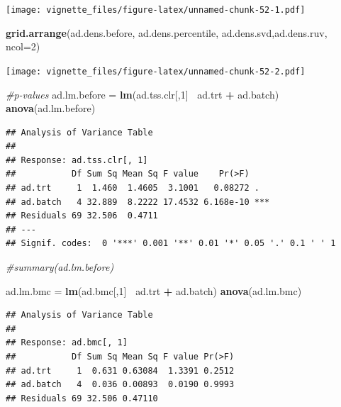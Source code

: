 \documentclass[]{book}
\newenvironment{Shaded}{\begin{snugshade}}{\end{snugshade}}
\newcommand{\KeywordTok}[1]{\textcolor[rgb]{0.13,0.29,0.53}{\textbf{#1}}}
\newcommand{\DataTypeTok}[1]{\textcolor[rgb]{0.13,0.29,0.53}{#1}}
\newcommand{\DecValTok}[1]{\textcolor[rgb]{0.00,0.00,0.81}{#1}}
\newcommand{\StringTok}[1]{\textcolor[rgb]{0.31,0.60,0.02}{#1}}
\newcommand{\CommentTok}[1]{\textcolor[rgb]{0.56,0.35,0.01}{\textit{#1}}}
\newcommand{\OperatorTok}[1]{\textcolor[rgb]{0.81,0.36,0.00}{\textbf{#1}}}
\newcommand{\NormalTok}[1]{#1}
\begin{document}
\texttt{[image: vignette\_files/figure-latex/unnamed-chunk-52-1.pdf]}

\begin{Shaded}
\begin{Highlighting}[]
\KeywordTok{grid.arrange}\NormalTok{(ad.dens.before, ad.dens.percentile, ad.dens.svd,ad.dens.ruv, }\DataTypeTok{ncol=}\DecValTok{2}\NormalTok{)}
\end{Highlighting}
\end{Shaded}

\texttt{[image: vignette\_files/figure-latex/unnamed-chunk-52-2.pdf]}

\begin{Shaded}
\begin{Highlighting}[]
\CommentTok{#p-values}
\NormalTok{ad.lm.before =}\StringTok{ }\KeywordTok{lm}\NormalTok{(ad.tss.clr[,}\DecValTok{1}\NormalTok{]}\OperatorTok{~}\StringTok{ }\NormalTok{ad.trt }\OperatorTok{+}\StringTok{ }\NormalTok{ad.batch)}
\KeywordTok{anova}\NormalTok{(ad.lm.before)}
\end{Highlighting}
\end{Shaded}

\begin{verbatim}
## Analysis of Variance Table
## 
## Response: ad.tss.clr[, 1]
##           Df Sum Sq Mean Sq F value    Pr(>F)    
## ad.trt     1  1.460  1.4605  3.1001   0.08272 .  
## ad.batch   4 32.889  8.2222 17.4532 6.168e-10 ***
## Residuals 69 32.506  0.4711                      
## ---
## Signif. codes:  0 '***' 0.001 '**' 0.01 '*' 0.05 '.' 0.1 ' ' 1
\end{verbatim}

\begin{Shaded}
\begin{Highlighting}[]
\CommentTok{#summary(ad.lm.before)}

\NormalTok{ad.lm.bmc =}\StringTok{ }\KeywordTok{lm}\NormalTok{(ad.bmc[,}\DecValTok{1}\NormalTok{]}\OperatorTok{~}\StringTok{ }\NormalTok{ad.trt }\OperatorTok{+}\StringTok{ }\NormalTok{ad.batch)}
\KeywordTok{anova}\NormalTok{(ad.lm.bmc)}
\end{Highlighting}
\end{Shaded}

\begin{verbatim}
## Analysis of Variance Table
## 
## Response: ad.bmc[, 1]
##           Df Sum Sq Mean Sq F value Pr(>F)
## ad.trt     1  0.631 0.63084  1.3391 0.2512
## ad.batch   4  0.036 0.00893  0.0190 0.9993
## Residuals 69 32.506 0.47110
\end{verbatim}
\end{document}

